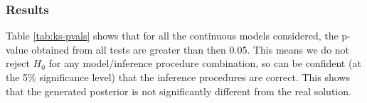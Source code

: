 \subsubsection{Results}

Table \ref{tab:ks-pvals} shows that for all the continuous models considered, the p-value obtained from all tests are greater than then 0.05. This means we do not reject $H_0$ for any model/inference procedure combination, so can be confident (at the 5\% significance level) that the inference procedures are correct. This shows that the generated posterior is not significantly different from the real solution.

\begin{table}[!ht]
	\centering
	\caption{p-values of K-S test on different models using different inference procedures}
	\label{tab:ks-pvals}
\end{table}


